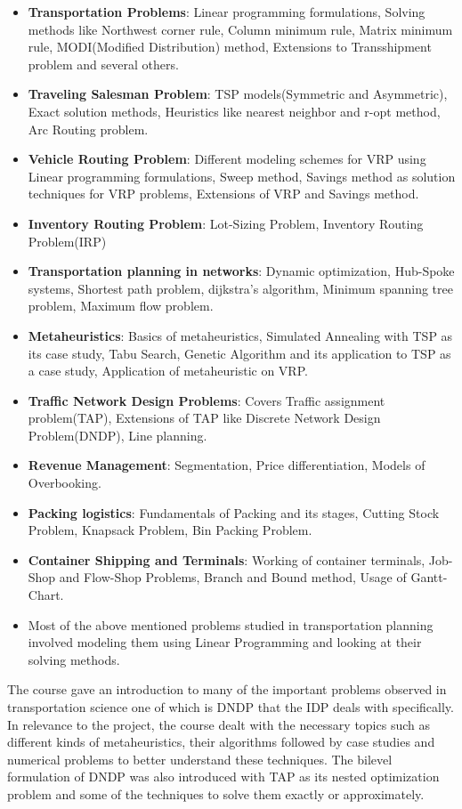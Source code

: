 \documentclass[a4paper, 12pt]{article}
\begin{document}
\begin{itemize}
\item \textbf{Transportation Problems}: Linear programming formulations, Solving methods like Northwest corner rule, Column minimum rule, Matrix minimum rule, MODI(Modified Distribution) method, Extensions to Transshipment problem and several others.
\item \textbf{Traveling Salesman Problem}: TSP models(Symmetric and Asymmetric), Exact solution methods, Heuristics like nearest neighbor and r-opt method, Arc Routing problem.
\item \textbf{Vehicle Routing Problem}: Different modeling schemes for VRP using Linear programming formulations, Sweep method, Savings method as solution techniques for VRP problems, Extensions of VRP and Savings method.
\item \textbf{Inventory Routing Problem}: Lot-Sizing Problem, Inventory Routing Problem(IRP)
\item \textbf{Transportation planning in networks}: Dynamic optimization, Hub-Spoke systems, Shortest path problem, dijkstra's algorithm, Minimum spanning tree problem, Maximum flow problem.
\item \textbf{Metaheuristics}: Basics of metaheuristics, Simulated Annealing with TSP as its case study, Tabu Search, Genetic Algorithm and its application to TSP as a case study, Application of metaheuristic on VRP.
\item \textbf{Traffic Network Design Problems}: Covers Traffic assignment problem(TAP), Extensions of TAP like Discrete Network Design Problem(DNDP), Line planning.
\item \textbf{Revenue Management}: Segmentation, Price differentiation, Models of Overbooking.
\item \textbf{Packing logistics}: Fundamentals of Packing and its stages, Cutting Stock Problem, Knapsack Problem, Bin Packing Problem.
\item \textbf{Container Shipping and Terminals}: Working of container terminals, Job-Shop and Flow-Shop Problems, Branch and Bound method, Usage of Gantt-Chart.
\item Most of the above mentioned problems studied in transportation planning involved modeling them using Linear Programming and looking at their solving methods.
\end{itemize}
The course gave an introduction to many of the important problems observed in transportation science one of which is DNDP that the IDP deals with specifically. In relevance to the project, the course dealt with the necessary topics such as different kinds of metaheuristics, their algorithms followed by case studies and numerical problems to better understand these techniques. The bilevel formulation of DNDP was also introduced with TAP as its nested optimization problem and some of the techniques to solve them exactly or approximately.\par
\end{document}
